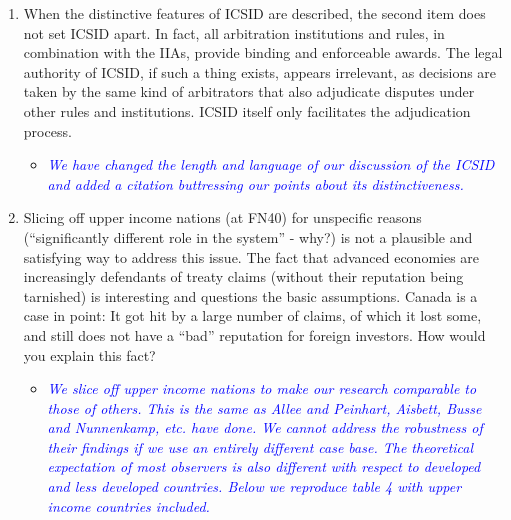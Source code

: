 \begin{enumerate}
	\item When the distinctive features of ICSID are described, the second item does not set ICSID apart. In fact, all arbitration institutions and rules, in combination with the IIAs, provide binding and enforceable awards. The legal authority of ICSID, if such a thing exists, appears irrelevant, as decisions are taken by the same kind of arbitrators that also adjudicate disputes under other rules and institutions. ICSID itself only facilitates the adjudication process. 
	\begin{itemize}
		\item \textcolor{blue}{ \emph{
		We have changed the length and language of our discussion of the ICSID and added a citation buttressing our points about its distinctiveness.
		}}
	\end{itemize}
	\clearpage
	\item Slicing off upper income nations (at FN40) for unspecific reasons (``significantly different role in the system'' - why?) is not a plausible and satisfying way to address this issue. The fact that advanced economies are increasingly defendants of treaty claims (without their reputation being tarnished) is interesting and questions the basic assumptions. Canada is a case in point: It got hit by a large number of claims, of which it lost some, and still does not have a ``bad'' reputation for foreign investors. How would you explain this fact?	
	\begin{itemize}
		\item \textcolor{blue}{ \emph{ We slice off upper income nations to make our research comparable to those of others. This is the same as Allee and Peinhart, Aisbett, Busse and Nunnenkamp, etc. have done. We cannot address the robustness of their findings if we use an entirely different case base. The theoretical expectation of most observers is also different with respect to developed and less developed countries. Below we reproduce table 4 with upper income countries included. }}


\end{itemize}
\end{enumerate}
